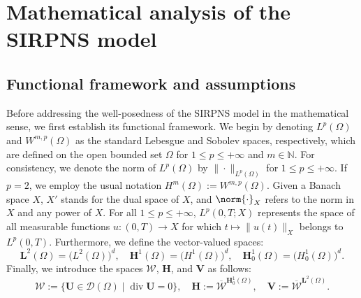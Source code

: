 \documentclass[10pt,number,preprint,times]{elsarticle}
\numberwithin{equation}{section} %
\begin{document}
	
	
	
	
	
	
	
	
	
	
	
	
\section{Mathematical analysis of the SIRPNS model}\label{analysis}

	
\subsection{Functional framework and assumptions}%
Before addressing the well-posedness of the SIRPNS model in the mathematical sense, we first establish its functional framework. We begin by denoting $L^p(\Omega)$ and $W^{m,p}(\Omega)$ as the standard Lebesgue and Sobolev spaces, respectively, which are defined on the open bounded set $\Omega$ for $1 \leq p \leq +\infty$ and $m \in \mathbb{N}$. For consistency, we denote the norm of $L^p(\Omega)$  by $\|\cdot\|_{L^p(\Omega)}$ for $1 \leq p \leq +\infty$. If $p = 2$, we employ the usual notation $H^m(\Omega) := W^{m,p}(\Omega)$. Given a Banach space $X$, $X'$ stands for the dual space of $X$, and $\norm{\cdot}_X$ refers to the norm in $X$ and any power of $X$. For all $1 \leq p \leq +\infty$, $L^p(0,T;X)$ represents the space of all measurable functions $u : (0,T) \to X$ for which $t \mapsto \|u(t)\|_X$ belongs to $L^p(0,T)$. 
Furthermore, we define the vector-valued spaces:
	\[
	\mathbf{L}^2(\Omega) = \big(L^2(\Omega)\big)^d, \quad 
	\mathbf{H}^1(\Omega) = \big(H^1(\Omega)\big)^d, \quad 
	\mathbf{H}_0^1(\Omega) = \big(H_0^1(\Omega)\big)^d.
	\]
Finally, we introduce the spaces $\mathcal{W}$, $\mathbf{H}$, and $\mathbf{V}$ as follows:
	\[
	\mathcal{W}:= \{\boldsymbol{U}\in \mathcal{D}(\Omega) \mid \operatorname{div} \boldsymbol{U} = 0\}, \quad 
	\mathbf{H}:= \overline{\mathcal{W}}^{\mathbf{H}^1_0(\Omega)}, \quad 
	\mathbf{V}:= \overline{\mathcal{W}}^{\mathbf{L}^2(\Omega)}.
	\]
	
\end{document}
